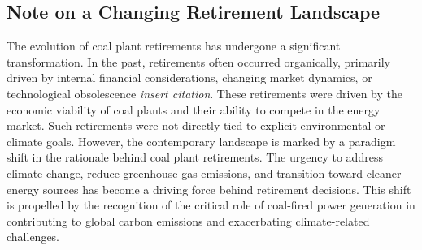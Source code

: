 
\subsection{Note on a Changing Retirement Landscape}\label{subsec:changing-retirement-landscape}


The evolution of coal plant retirements has undergone a significant transformation. 
In the past, retirements often occurred organically, primarily driven by internal financial considerations, 
changing market dynamics, or technological obsolescence \textit{insert citation}. 
These retirements were driven by the economic viability of coal plants and their ability to compete 
in the energy market. Such retirements were not directly tied to explicit environmental or climate goals. 
However, the contemporary landscape is marked by a paradigm shift in the rationale behind coal plant retirements. 
The urgency to address climate change, reduce greenhouse gas emissions, and transition toward cleaner energy 
sources has become a driving force behind retirement decisions. This shift is propelled by the recognition of 
the critical role of coal-fired power generation in contributing to global carbon emissions and exacerbating 
climate-related challenges.

